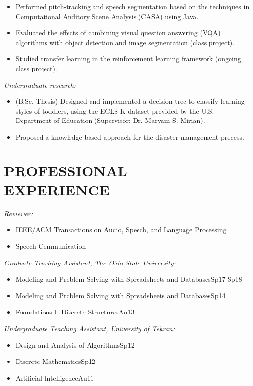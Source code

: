 \documentclass[margin, 10pt]{res}
\begin{document}
\begin{resume}
\begin{itemize}
\begin{itemize}
	\end{itemize}
\item Performed pitch-tracking and speech segmentation based on the techniques in Computational Auditory Scene Analysis (CASA) using Java.
\item Evaluated the effects of combining visual question answering (VQA) algorithms with object detection and image segmentation (class project).
\item Studied transfer learning in the reinforcement learning framework (ongoing class project).
\end{itemize}
\textit{Undergraduate research:}
\begin{itemize}
\item (B.Sc. Thesis) Designed and implemented a decision tree to classify learning styles of toddlers, using the ECLS-K dataset provided by the U.S. Department of Education (Supervisor: Dr. Maryam S. Mirian).
\item Proposed a knowledge-based approach for the disaster management process.
\end{itemize}
\section{PROFESSIONAL\\EXPERIENCE}
\textit{Reviewer:}
\begin{itemize}
\item IEEE/ACM Transactions on Audio, Speech, and Language Processing
\item Speech Communication
\end{itemize}
\textit{Graduate Teaching Assistant, The Ohio State University:}
\begin{itemize}
\item Modeling and Problem Solving with Spreadsheets and Databases\hfill {\footnotesize Sp17-Sp18}
\item Modeling and Problem Solving with Spreadsheets and Databases\hfill {\footnotesize Sp14}
\item Foundations I: Discrete Structures\hfill {\footnotesize Au13}
\end{itemize}
\textit{Undergraduate Teaching Assistant, University of Tehran:}
\begin{itemize}
\item Design and Analysis of Algorithms\hfill {\footnotesize Sp12}
\item Discrete Mathematics\hfill {\footnotesize Sp12}
\item Artificial Intelligence\hfill {\footnotesize Au11}
\end{itemize}


\end{resume}
\end{document}
